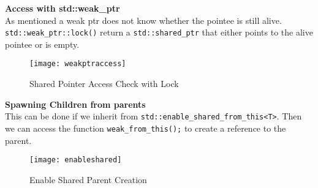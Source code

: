 \textbf{Access with std::weak\_ptr}\\
As mentioned a weak ptr does not know whether the pointee is still alive. \lstinline|std::weak_ptr::lock()| return a \lstinline|std::shared_ptr| that either points to the alive pointee or is empty.

\begin{figure}[h!]
  \center
  \texttt{[image: weakptraccess]}
  \caption{Shared Pointer Access Check with Lock}
\end{figure}

\textbf{Spawning Children from parents}\\
This can be done if we inherit from \lstinline|std::enable_shared_from_this<T>|. Then we can access the function \lstinline|weak_from_this();| to create a reference to the parent.

\begin{figure}[h!]
  \center
  \texttt{[image: enableshared]}
  \caption{Enable Shared Parent Creation}
\end{figure}

